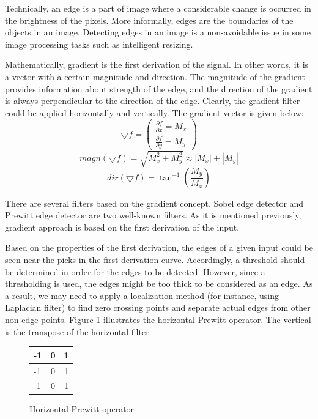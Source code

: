 \documentclass{article}
\begin{document}
			Technically, an edge is a part of image where a considerable change is occurred in the brightness of the pixels.
			More informally, edges are the boundaries of
			the objects in an image. Detecting edges in an image is a non-avoidable issue in some image processing tasks such as intelligent resizing.
			
			Mathematically, gradient is the first derivation of the signal. In other words, it is a vector with a certain magnitude and direction. 
			The magnitude of the gradient provides information about strength
			of the edge, and the direction of the gradient is always perpendicular to the direction of the edge. Clearly, the gradient filter could be
			applied horizontally and vertically. The gradient vector is given below:
\begin{equation}
  \bigtriangledown f = \begin{pmatrix}
\frac{\partial f}{\partial x} = M_x\\ 
\frac{\partial f}{\partial y} = M_y
\end{pmatrix}
\end{equation}
\begin{equation}
magn(\bigtriangledown f) = \sqrt{M_x^{2}+M_y^{2}}\approx \left | M_x \right |+\left | M_y \right |
\end{equation}
\begin{equation}
dir(\bigtriangledown f) = \tan^{-1}(\frac{M_y}{M_x})
\end{equation}



			There are several filters based on the gradient concept. Sobel edge detector and Prewitt edge detector are two well-known filters.
			As it is mentioned previously, gradient approach is based on the first derivation of the input.

 Based on the properties of
			the first derivation, the edges of a given input could be seen near the picks in the first derivation curve. Accordingly, a threshold should be
			determined in order for the edges to be detected. However, since a thresholding is used, the edges might be too thick to be considered
			as an edge. As a result, we may need to apply a localization method (for instance, using Laplacian filter) to find zero
			crossing points and separate actual edges from other non-edge points. Figure \ref{pre}  illustrates the horizontal Prewitt operator. The vertical is the transpose of the horizontal filter.


\begin{figure}[H]
\begin{center}
 \begin{tabular}{ | l | c | r | }
    \hline
    -1 & 0 & 1 \\ \hline
    -1 & 0 & 1 \\ \hline
    -1 & 0 & 1 \\
    \hline
  \end{tabular}
\end{center}
\caption{Horizontal Prewitt operator\label{pre}}\end{figure}
\end{document}
